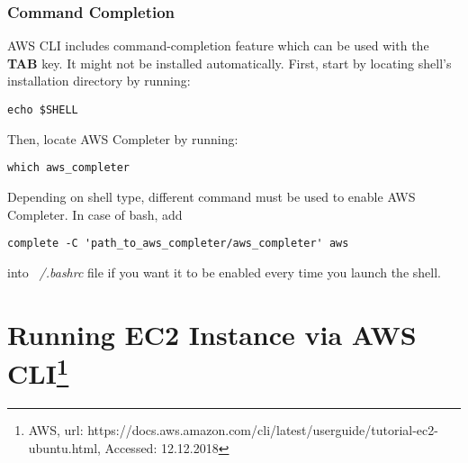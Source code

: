 \documentclass[12pt,english]{article}
\begin{document}
\subsubsection*{Command Completion}
AWS CLI includes command-completion feature which can be used with the \textbf{TAB} key. It might not be installed automatically. 
First, start by locating shell's installation directory by running:
\begin{lstlisting}
echo $SHELL
\end{lstlisting}
Then, locate AWS Completer by running:
\begin{lstlisting}
which aws_completer
\end{lstlisting}
Depending on shell type, different command must be used to enable AWS Completer. In case of bash, add
\begin{lstlisting}
complete -C 'path_to_aws_completer/aws_completer' aws
\end{lstlisting}
into \textit{~/.bashrc} file if you want it to be enabled every time you launch the shell.
 	
\section{Running EC2 Instance via AWS CLI\footnote{AWS, url: https://docs.aws.amazon.com/cli/latest/userguide/tutorial-ec2-ubuntu.html, Accessed: 12.12.2018}}
\end{document}
